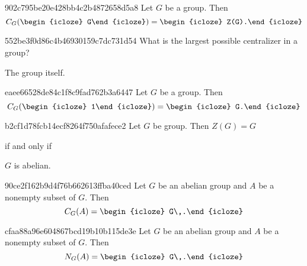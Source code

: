\begin{note}{902c795be20e428bb4c2b4872658d5a8}
    Let \({ G }\) be a group. Then
    \[
        C_G(\begin{icloze}{2}G\end{icloze}) = \begin{icloze}{1}Z(G).\end{icloze}
    \]
\end{note}

\begin{note}{552be3f0d86c4b46930159c7dc731d54}
    What is the largest possible centralizer in a group?

    \begin{cloze}{1}
        The group itself.
    \end{cloze}
\end{note}

\begin{note}{eaee66528de84c1f8c9fad762b3a6447}
    Let \({ G }\) be a group. Then
    \[
        C_G(\begin{icloze}{2}1\end{icloze}) = \begin{icloze}{1}G.\end{icloze}
    \]
\end{note}

\begin{note}{b2cf1d78fcb14ecf8264f750afafece2}
    Let \({ G }\) be group.
    Then \({ Z(G) = G }\) \begin{icloze}{2}if and only if\end{icloze} \begin{icloze}{1}\({ G }\) is abelian.\end{icloze}
\end{note}

\begin{note}{90ce2f162b9d4f76b662613ffba40ced}
    Let \({ G }\) be an abelian group and \({ A }\) be a nonempty subset of \({ G }\).
    Then
    \[
        C_G(A) = \begin{icloze}{1}G\,.\end{icloze}
    \]
\end{note}

\begin{note}{cfaa88a96e604867bcd19b10b115de3e}
    Let \({ G }\) be an abelian group and \({ A }\) be a nonempty subset of \({ G }\).
    Then
    \[
        N_G(A) = \begin{icloze}{1}G\,.\end{icloze}
    \]
\end{note}


